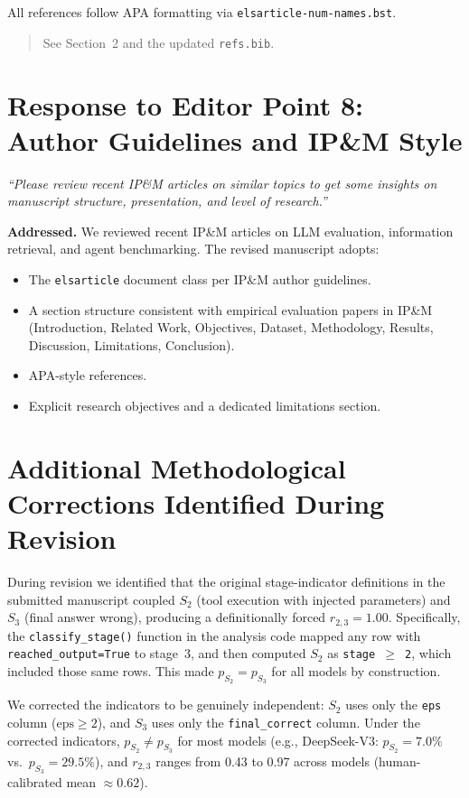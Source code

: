 \documentclass[11pt]{article}
\newcommand{\editortext}[1]{\textit{\color{gray}#1}}
\newcommand{\newtext}[1]{\begin{quote}\small #1\end{quote}}
\begin{document}
All references follow APA formatting via \texttt{elsarticle-num-names.bst}.

\newtext{See Section~2 and the updated \texttt{refs.bib}.}

\section{Response to Editor Point 8: Author Guidelines and IP\&M Style}

\editortext{``Please review recent IP\&M articles on similar topics to
get some insights on manuscript structure, presentation, and level of
research.''}

\textbf{Addressed.} We reviewed recent IP\&M articles on LLM evaluation,
information retrieval, and agent benchmarking. The revised manuscript
adopts:
\begin{itemize}[nosep]
  \item The \texttt{elsarticle} document class per IP\&M author guidelines.
  \item A section structure consistent with empirical evaluation papers
        in IP\&M (Introduction, Related Work, Objectives, Dataset,
        Methodology, Results, Discussion, Limitations, Conclusion).
  \item APA-style references.
  \item Explicit research objectives and a dedicated limitations section.
\end{itemize}

\section{Additional Methodological Corrections Identified During Revision}

During revision we identified that the original stage-indicator
definitions in the submitted manuscript coupled $S_2$ (tool execution
with injected parameters) and $S_3$ (final answer wrong), producing a
definitionally forced $r_{2,3} = 1.00$. Specifically, the
\texttt{classify\_stage()} function in the analysis code mapped any row
with \texttt{reached\_output=True} to stage~3, and then computed $S_2$
as \texttt{stage $\geq$ 2}, which included those same rows. This made
$p_{S_2} = p_{S_3}$ for all models by construction.

We corrected the indicators to be genuinely independent: $S_2$ uses only
the \texttt{eps} column ($\text{eps} \geq 2$), and $S_3$ uses only the
\texttt{final\_correct} column. Under the corrected indicators, $p_{S_2}
\neq p_{S_3}$ for most models (e.g., DeepSeek-V3: $p_{S_2}=7.0\%$ vs.\
$p_{S_3}=29.5\%$), and $r_{2,3}$ ranges from 0.43 to 0.97 across models
(human-calibrated mean $\approx 0.62$).
\end{document}
